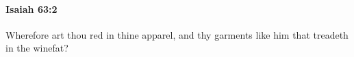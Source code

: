 
		\paragraph{Isaiah 63:2} %
			\label{ISAIAH-63-2}

			Wherefore art thou red in thine apparel, and thy garments like him that treadeth in the winefat?


